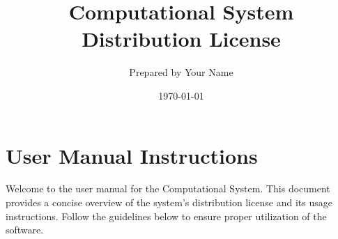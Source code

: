 \documentclass[12pt]{article}
\title{\textbf{Computational System Distribution License}}
\author{Prepared by Your Name}
\date{\today}
\begin{document}
\maketitle

\section*{User Manual Instructions}
\onehalfspacing
Welcome to the user manual for the Computational System. This document provides a concise overview of the system's distribution license and its usage instructions. Follow the guidelines below to ensure proper utilization of the software.
\end{document}
